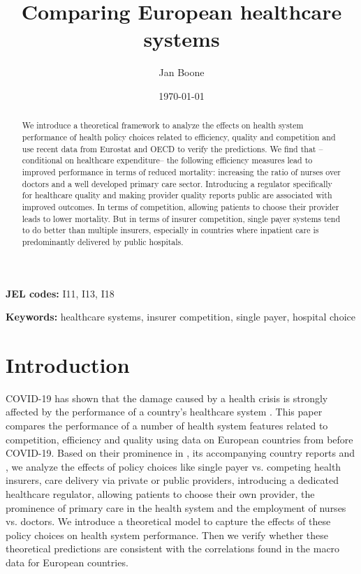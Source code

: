 \documentclass[a4paper,12pt]{article}
\author{Jan Boone\inst{*}}
\date{\today}
\title{Comparing European healthcare systems}
\begin{document}
\maketitle
\begin{abstract}
We introduce a theoretical framework to analyze the effects on health system performance of health policy choices related to efficiency, quality and competition and use recent data from Eurostat and OECD to verify the predictions. We find that --conditional on healthcare expenditure-- the following efficiency measures lead to improved performance in terms of reduced mortality:  increasing the ratio of nurses over doctors and a well developed primary care sector. Introducing a regulator specifically for healthcare quality and making provider quality reports public are associated with improved outcomes. In terms of competition, allowing patients to choose their provider leads to lower mortality. But in terms of insurer competition, single payer systems tend to do better than multiple insurers, especially in countries where inpatient care is predominantly delivered by public hospitals.
\end{abstract}

\textbf{JEL codes:} I11, I13, I18

\textbf{Keywords:} healthcare systems, insurer competition, single payer, hospital choice


\vspace*{\fill}

\newpage

\section{Introduction}
\label{sec:org011eb44}

COVID-19 has shown that the damage caused by a health crisis is strongly affected by the performance of a country's healthcare system \citep{OECD_2020}. This paper compares the performance of a number of health system features related to competition, efficiency and quality using data on European countries from before COVID-19. Based on their prominence in \cite{countryprofileReport}, its accompanying country reports and \cite{OECD_2020}, we analyze the effects of policy choices like single payer vs. competing health insurers, care delivery via private or public providers, introducing a dedicated healthcare regulator, allowing patients to choose their own provider, the prominence of primary care in the health system and the employment of nurses vs. doctors. We introduce a theoretical model to capture the effects of these policy choices on health system performance. Then we verify whether these theoretical predictions are consistent with the correlations found in the macro data for European countries.
\end{document}
